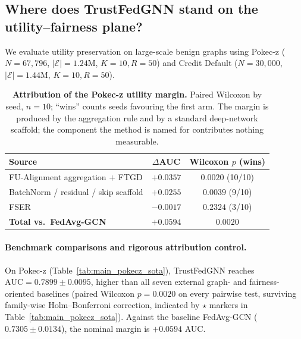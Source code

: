 \documentclass[preprint,12pt]{elsarticle}
\theoremstyle{plain}
\theoremstyle{definition}
\theoremstyle{remark}
\begin{document}
\subsection{Where does TrustFedGNN stand on the utility--fairness plane?}
\label{sec:res_sota}




We evaluate utility preservation on large-scale benign graphs using Pokec-z ($N = 67{,}796$, $\lvert\mathcal{E}\rvert = 1.24$M, $K=10, R=50$) and Credit Default ($N = 30{,}000$, $\lvert\mathcal{E}\rvert = 1.44$M, $K=10, R=50$).

\begin{table}[t]
\centering
\small
\caption{\textbf{Attribution of the Pokec-z utility margin.} Paired Wilcoxon by seed, $n = 10$; ``wins'' counts seeds favouring the first arm. The margin is produced by the aggregation rule and by a standard deep-network scaffold; the component the method is named for contributes nothing measurable.}
\label{tab:attribution}
\begin{tabular}{lcc}
\toprule
\textbf{Source} & \textbf{$\Delta$AUC} & \textbf{Wilcoxon $p$ (wins)} \\
\midrule
FU-Alignment aggregation $+$ FTGD & $+0.0357$ & $0.0020$ (10/10) \\
BatchNorm / residual / skip scaffold & $+0.0255$ & $0.0039$ (9/10) \\
FSER & $-0.0017$ & $0.2324$ (3/10) \\
\midrule
\textbf{Total vs.\ FedAvg-GCN} & $\bm{+0.0594}$ & $\bm{0.0020}$ \\
\bottomrule
\end{tabular}
\end{table}

\paragraph{Benchmark comparisons and rigorous attribution control.}
On Pokec-z (Table~\ref{tab:main_pokecz_sota}), TrustFedGNN reaches $\mathrm{AUC} = 0.7899 \pm 0.0095$, higher than all seven external graph- and fairness-oriented baselines (paired Wilcoxon $p = 0.0020$ on every pairwise test, surviving family-wise Holm--Bonferroni correction, indicated by $\star$ markers in Table~\ref{tab:main_pokecz_sota}). Against the baseline FedAvg-GCN ($0.7305 \pm 0.0134$), the nominal margin is $+0.0594$ AUC.
\end{document}
